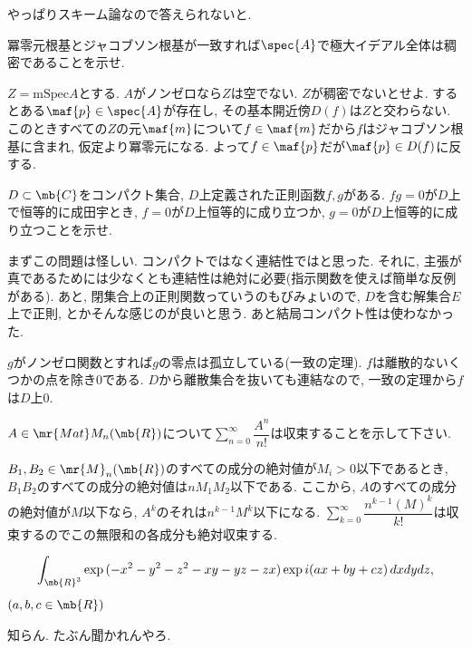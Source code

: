 やっぱりスキーム論なので答えられないと. 
\begin{prob}
冪零元根基とジャコブソン根基が一致すれば$\spec{A}$で極大イデアル全体は稠密であることを示せ.
\end{prob}
\begin{ans}
$Z = \mathrm{mSpec}A$とする. $A$がノンゼロなら$Z$は空でない. $Z$が稠密でないとせよ. するとある$\maf{p}\in \spec{A}$が存在し, その基本開近傍$D(f)$は$Z$と交わらない. このときすべての$Z$の元$\maf{m}$について$f\in \maf{m}$だから$f$はジャコブソン根基に含まれ, 仮定より冪零元になる. よって$f\in \maf{p}$だが$\maf{p}\in D(f)$に反する.
\end{ans}
\begin{prob}
$D\subset \mb{C}$をコンパクト集合, $D$上定義された正則函数$f,g$がある. $fg = 0$が$D$上で恒等的に成田宇とき, $f=0$が$D$上恒等的に成り立つか, $g=0$が$D$上恒等的に成り立つことを示せ. 
\end{prob}
\begin{ans}
まずこの問題は怪しい. コンパクトではなく連結性ではと思った. それに, 主張が真であるためには少なくとも連結性は絶対に必要(指示関数を使えば簡単な反例がある). あと, 閉集合上の正則関数っていうのもびみょいので, $D$を含む解集合$E$上で正則, とかそんな感じのが良いと思う. あと結局コンパクト性は使わなかった.\par 
$g$がノンゼロ関数とすれば$g$の零点は孤立している(一致の定理). $f$は離散的ないくつかの点を除き0である. $D$から離散集合を抜いても連結なので, 一致の定理から$f$は$D$上0.
\end{ans}

\begin{prob}
$A\in \mr{Mat}M_{n}(\mb{R})$について$\sum_{n=0}^{\infty} \dfrac{A^n}{n!}$は収束することを示して下さい. 
\end{prob}

\begin{ans}
$B_1,B_2\in \mr{M}_{n}(\mb{R})$のすべての成分の絶対値が$M_i>0$以下であるとき, $B_1B_2$のすべての成分の絶対値は$nM_1M_2$以下である. ここから, $A$のすべての成分の絶対値が$M$以下なら, $A^k$のそれは$n^{k-1}M^{k}$以下になる. $\sum_{k=0}^{\infty} \dfrac{n^{k-1}(M)^{k}}{k!}$は収束するのでこの無限和の各成分も絶対収束する.  
\end{ans}

\begin{prob}
{\small
\[\int_{\mb{R}^3} \exp{(-x^2-y^2-z^2-xy-yz-zx)}\exp{i(ax + by + cz)}\, dxdydz,\]
}
$(a,b,c\in \mb{R})$
\end{prob}
\begin{ans}
知らん. たぶん聞かれんやろ. 
\end{ans}


